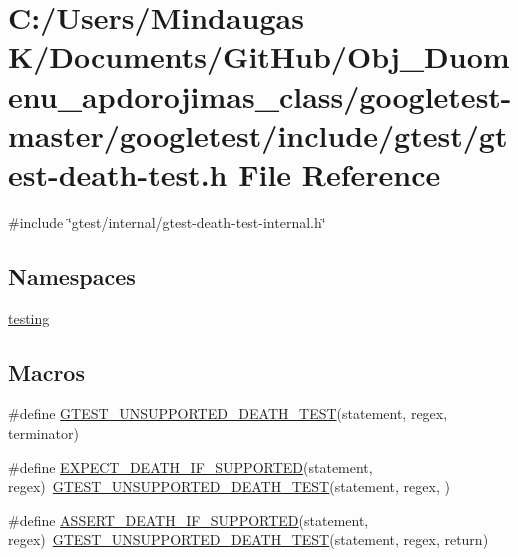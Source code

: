 \hypertarget{googletest-master_2googletest_2include_2gtest_2gtest-death-test_8h}{}\section{C\+:/\+Users/\+Mindaugas K/\+Documents/\+Git\+Hub/\+Obj\+\_\+\+Duomenu\+\_\+apdorojimas\+\_\+class/googletest-\/master/googletest/include/gtest/gtest-\/death-\/test.h File Reference}
\label{googletest-master_2googletest_2include_2gtest_2gtest-death-test_8h}
{\ttfamily \#include \char`\"{}gtest/internal/gtest-\/death-\/test-\/internal.\+h\char`\"{}}\newline
\subsection*{Namespaces}
\begin{DoxyCompactItemize}
\item 
 \mbox{\hyperlink{namespacetesting}{testing}}
\end{DoxyCompactItemize}
\subsection*{Macros}
\begin{DoxyCompactItemize}
\item 
\#define \mbox{\hyperlink{googletest-master_2googletest_2include_2gtest_2gtest-death-test_8h_aa5f42ab29859b7f49a901770d2e66855}{G\+T\+E\+S\+T\+\_\+\+U\+N\+S\+U\+P\+P\+O\+R\+T\+E\+D\+\_\+\+D\+E\+A\+T\+H\+\_\+\+T\+E\+ST}}(statement,  regex,  terminator)
\item 
\#define \mbox{\hyperlink{googletest-master_2googletest_2include_2gtest_2gtest-death-test_8h_a8564de0e012dd0898949c513d1571f8b}{E\+X\+P\+E\+C\+T\+\_\+\+D\+E\+A\+T\+H\+\_\+\+I\+F\+\_\+\+S\+U\+P\+P\+O\+R\+T\+ED}}(statement,  regex)~\mbox{\hyperlink{_obj__test_2lib_2googletest-release-1_88_81_2googletest_2include_2gtest_2gtest-death-test_8h_aa5f42ab29859b7f49a901770d2e66855}{G\+T\+E\+S\+T\+\_\+\+U\+N\+S\+U\+P\+P\+O\+R\+T\+E\+D\+\_\+\+D\+E\+A\+T\+H\+\_\+\+T\+E\+ST}}(statement, regex, )
\item 
\#define \mbox{\hyperlink{googletest-master_2googletest_2include_2gtest_2gtest-death-test_8h_ab2f0f25b46353767179a49ebd15b7345}{A\+S\+S\+E\+R\+T\+\_\+\+D\+E\+A\+T\+H\+\_\+\+I\+F\+\_\+\+S\+U\+P\+P\+O\+R\+T\+ED}}(statement,  regex)~\mbox{\hyperlink{_obj__test_2lib_2googletest-release-1_88_81_2googletest_2include_2gtest_2gtest-death-test_8h_aa5f42ab29859b7f49a901770d2e66855}{G\+T\+E\+S\+T\+\_\+\+U\+N\+S\+U\+P\+P\+O\+R\+T\+E\+D\+\_\+\+D\+E\+A\+T\+H\+\_\+\+T\+E\+ST}}(statement, regex, return)
\end{DoxyCompactItemize}
